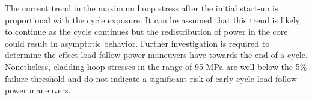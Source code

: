 \documentclass[edeposit,fullpage,11pt]{uiucthesis2009}
\begin{document}
The current trend in the maximum hoop stress after the initial start-up is proportional with the cycle exposure.
It can be assumed that this trend is likely to continue as the cycle continues but the redistribution of power in the core could result in asymptotic behavior.
Further investigation is required to determine the effect load-follow power maneuvers have towards the end of a cycle.
Nonetheless, cladding hoop stresses in the range of 95 MPa are well below the 5\% failure threshold and do not indicate a significant risk of early cycle load-follow power maneuvers. 

\begin{table}
\caption{Maximum clad hoop stress for each load-follow power maneuver}
\label{tab:MHS}
\begin{center}
\end{center}
\end{table}
\end{document}
